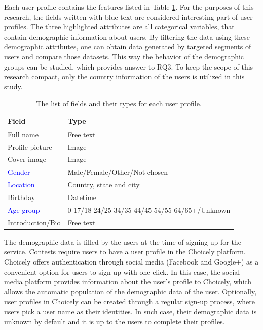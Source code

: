 Each user profile contains the features listed in Table \ref{user_profile_fields}. For the purposes of this research, the fields written with blue text are considered interesting part of user profiles. The three highlighted attributes are all categorical variables, that contain demographic information about users. By filtering the data using these demographic attributes, one can obtain data generated by targeted segments of users and compare those datasets. This way the behavior of the demographic groups can be studied, which provides answer to RQ3. To keep the scope of this research compact, only the country information of the users is utilized in this study.

\begin{table}[]
    \centering
    \begin{tabular}{l|l}
        \textbf{Field}              & \textbf{Type} \\
        \hline
        Full name                   & Free text \\
        Profile picture             & Image \\ 
        Cover image                 & Image \\
        \textcolor{blue}{Gender}    & Male/Female/Other/Not chosen \\
        \textcolor{blue}{Location}  & Country, state and city \\
        Birthday                    & Datetime \\ 
        \textcolor{blue}{Age group} & 0-17/18-24/25-34/35-44/45-54/55-64/65+/Unknown \\
        Introduction/Bio            & Free text
    \end{tabular}
    \caption{The list of fields and their types for each user profile.}
    \label{user_profile_fields}
\end{table}  

The demographic data is filled by the users at the time of signing up for the service. Contests require users to have a user profile in the Choicely platform. Choicely offers authentication through social media (Facebook and Google+) as a convenient option for users to sign up with one click. In this case, the social media platform provides information about the user's profile to Choicely, which allows the automatic population of the demographic data of the user. Optionally, user profiles in Choicely can be created through a regular sign-up process, where users pick a user name as their identities. In such case, their demographic data is unknown by default and it is up to the users to complete their profiles. 

